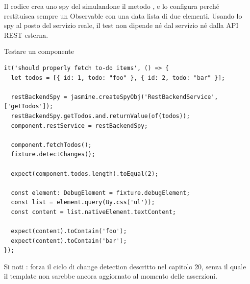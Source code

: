 Il codice crea uno spy del  simulandone il metodo
, e lo configura perché restituisca sempre un Observable con
una data lista di due elementi. Usando lo spy al posto del servizio reale, il
test non dipende né dal servizio né dalla API REST esterna.

\begin{esempio}{Testare un componente}
\begin{affianco}[0.6][c]
\codicepiccolo
\begin{lstlisting}[style=ts, name=todo-page.component.spec.ts]
it('should properly fetch to-do items', () => {
  let todos = [{ id: 1, todo: "foo" }, { id: 2, todo: "bar" }];

  restBackendSpy = jasmine.createSpyObj('RestBackendService', ['getTodos']);
  restBackendSpy.getTodos.and.returnValue(of(todos));
  component.restService = restBackendSpy;

  component.fetchTodos();
  fixture.detectChanges();

  expect(component.todos.length).toEqual(2);

  const element: DebugElement = fixture.debugElement;
  const list = element.query(By.css('ul'));
  const content = list.nativeElement.textContent;

  expect(content).toContain('foo');
  expect(content).toContain('bar');
});
\end{lstlisting}
\risultato
\begin{immagine}
\end{immagine}
\end{affianco}

Si noti : forza il ciclo di change detection
descritto nel capitolo 20, senza il quale il template non sarebbe ancora
aggiornato al momento delle asserzioni.
\end{esempio}


